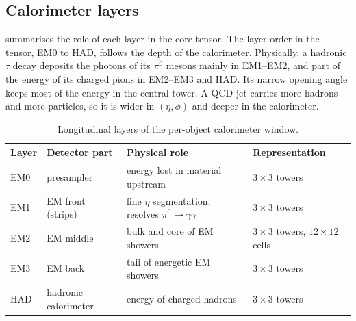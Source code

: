 \subsection{Calorimeter layers}
 summarises the role of each layer in the core tensor. The layer order in the tensor, EM0 to HAD, follows the depth of the calorimeter. Physically, a hadronic $\tau$ decay deposits the photons of its $\pi^0$ mesons mainly in EM1--EM2, and part of the energy of its charged pions in EM2--EM3 and HAD. Its narrow opening angle keeps most of the energy in the central tower. A QCD jet carries more hadrons and more particles, so it is wider in $(\eta,\phi)$ and deeper in the calorimeter.

\begin{table}[h]
  \centering
  \caption{Longitudinal layers of the per-object calorimeter window.}
  \label{tab:layers}
  \small
  \begin{tabularx}{\linewidth}{@{}llXl@{}}
    \toprule
    Layer & Detector part & Physical role & Representation \\
    \midrule
    EM0 & presampler & energy lost in material upstream & $3\times3$ towers \\
    EM1 & EM front (strips) & fine $\eta$ segmentation; resolves $\pi^0\to\gamma\gamma$ & $3\times3$ towers \\
    EM2 & EM middle & bulk and core of EM showers & $3\times3$ towers, $12\times12$ cells \\
    EM3 & EM back & tail of energetic EM showers & $3\times3$ towers \\
    HAD & hadronic calorimeter & energy of charged hadrons & $3\times3$ towers \\
    \bottomrule
  \end{tabularx}
\end{table}


